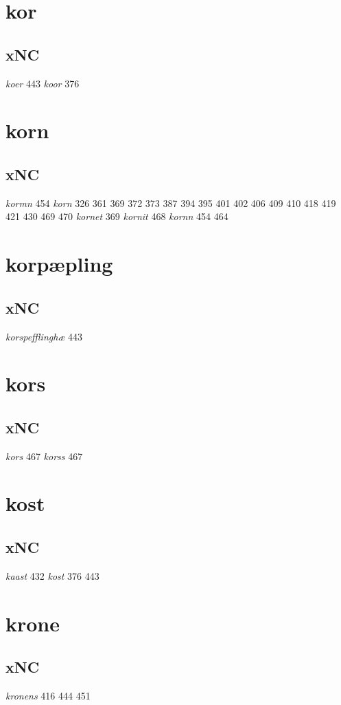 \documentclass[a4paper,twocolumn]{article}
\begin{document}
\section{kor}
\label{sec:orgfaee2c8}
\subsection{xNC}
\label{sec:orgb54c579}
\emph{koer} 443 \emph{koor} 376 
\section{korn}
\label{sec:orga3cbc67}
\subsection{xNC}
\label{sec:org3203b1f}
\emph{kormn} 454 \emph{korn} 326 361 369 372 373 387 394 395 401 402 406 409 410 418 419 421 430 469 470 \emph{kornet} 369 \emph{kornit} 468 \emph{kornn} 454 464 
\section{korpæpling}
\label{sec:org3f883a8}
\subsection{xNC}
\label{sec:orga781a9b}
\emph{korspefflinghæ} 443 
\section{kors}
\label{sec:org9c6917b}
\subsection{xNC}
\label{sec:orgf47473d}
\emph{kors} 467 \emph{korss} 467 
\section{kost}
\label{sec:org1c6a005}
\subsection{xNC}
\label{sec:orgba5b7a8}
\emph{kaast} 432 \emph{kost} 376 443 
\section{krone}
\label{sec:org0ab5a05}
\subsection{xNC}
\label{sec:orgdf894cb}
\emph{kronens} 416 444 451 
\end{document}
